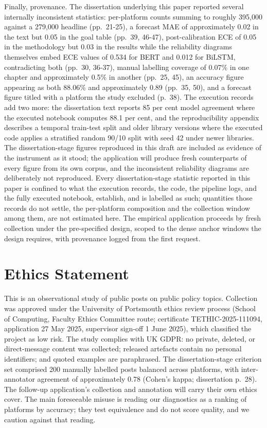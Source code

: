 Finally, provenance. The dissertation underlying this paper reported several internally inconsistent statistics: per-platform counts summing to roughly 395,000 against a 279,000 headline (pp.~21-25), a forecast MAE of approximately 0.02 in the text but 0.05 in the goal table (pp.~39, 46-47), post-calibration ECE of 0.05 in the methodology but 0.03 in the results while the reliability diagrams themselves embed ECE values of 0.534 for BERT and 0.012 for BiLSTM, contradicting both (pp.~30, 36-37), manual labelling coverage of 0.07\% in one chapter and approximately 0.5\% in another (pp.~25, 45), an accuracy figure appearing as both 88.06\% and approximately 0.89 (pp.~35, 50), and a forecast figure titled with a platform the study excluded (p.~38). The execution records add two more: the dissertation text reports 85 per cent model agreement where the executed notebook computes 88.1 per cent, and the reproducibility appendix describes a temporal train-test split and older library versions where the executed code applies a stratified random 90/10 split with seed 42 under newer libraries. The dissertation-stage figures reproduced in this draft are included as evidence of the instrument as it stood; the application will produce fresh counterparts of every figure from its own corpus, and the inconsistent reliability diagrams are deliberately not reproduced. Every dissertation-stage statistic reported in this paper is confined to what the execution records, the code, the pipeline logs, and the fully executed notebook, establish, and is labelled as such; quantities those records do not settle, the per-platform composition and the collection window among them, are not estimated here. The empirical application proceeds by fresh collection under the pre-specified design, scoped to the dense anchor windows the design requires, with provenance logged from the first request.

\section{Ethics Statement}
\label{sec:ethics}

This is an observational study of public posts on public policy topics. Collection was approved under the University of Portsmouth ethics review process (School of Computing, Faculty Ethics Committee route; certificate TETHIC-2025-111094, application 27 May 2025, supervisor sign-off 1 June 2025), which classified the project as low risk. The study complies with UK GDPR: no private, deleted, or direct-message content was collected; released artefacts contain no personal identifiers; and quoted examples are paraphrased. The dissertation-stage criterion set comprised 200 manually labelled posts balanced across platforms, with inter-annotator agreement of approximately 0.78 (Cohen's kappa; dissertation p.~28).  The follow-up application's collection and annotation will carry their own ethics cover. The main foreseeable misuse is reading our diagnostics as a ranking of platforms by accuracy; they test equivalence and do not score quality, and we caution against that reading.

